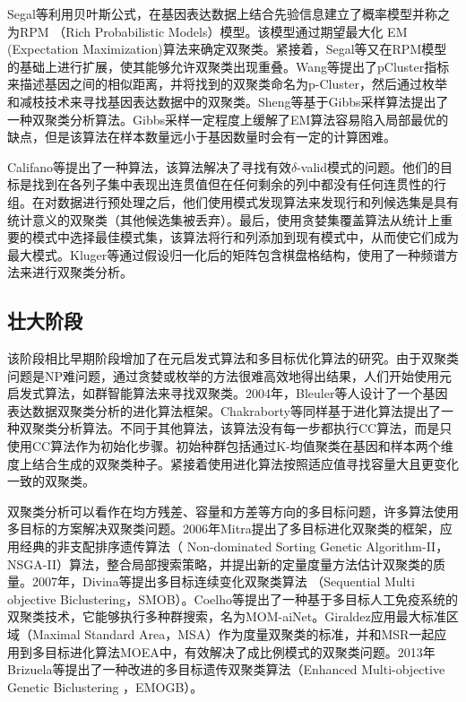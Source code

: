     Segal\cite{segal2001rich}等利用贝叶斯公式，在基因表达数据上结合先验信息建立了概率模型并称之为RPM （Rich Probabilistic Models）模型。该模型通过期望最大化 EM (Expectation Maximization)算法来确定双聚类。紧接着，Segal\cite{segal2002decomposing}等又在RPM模型的基础上进行扩展，使其能够允许双聚类出现重叠。Wang\cite{wang2002clustering}等提出了pCluster指标来描述基因之间的相似距离，并将找到的双聚类命名为p-Cluster，然后通过枚举和减枝技术来寻找基因表达数据中的双聚类。Sheng\cite{sheng2003biclustering}等基于Gibbs采样算法提出了一种双聚类分析算法。Gibbs采样一定程度上缓解了EM算法容易陷入局部最优的缺点，但是该算法在样本数量远小于基因数量时会有一定的计算困难。

    Califano\cite{califano2000analysis}等提出了一种算法，该算法解决了寻找有效$\delta$-valid模式的问题。他们的目标是找到在各列子集中表现出连贯值但在任何剩余的列中都没有任何连贯性的行组。在对数据进行预处理之后，他们使用模式发现算法来发现行和列候选集是具有统计意义的双聚类（其他候选集被丢弃）。最后，使用贪婪集覆盖算法从统计上重要的模式中选择最佳模式集，该算法将行和列添加到现有模式中，从而使它们成为最大模式。Kluger\cite{kluger2003spectral}等通过假设归一化后的矩阵包含棋盘格结构，使用了一种频谱方法来进行双聚类分析。

    \subsection{壮大阶段}
    该阶段相比早期阶段增加了在元启发式算法和多目标优化算法的研究。由于双聚类问题是NP难问题，通过贪婪或枚举的方法很难高效地得出结果，人们开始使用元启发式算法，如群智能算法来寻找双聚类。2004年，Bleuler\cite{bleuler2004ea}等人设计了一个基因表达数据双聚类分析的进化算法框架。Chakraborty\cite{chakraborty2005biclustering}等同样基于进化算法提出了一种双聚类分析算法。不同于其他算法，该算法没有每一步都执行CC算法，而是只使用CC算法作为初始化步骤。初始种群包括通过K-均值聚类在基因和样本两个维度上结合生成的双聚类种子。紧接着使用进化算法按照适应值寻找容量大且更变化一致的双聚类。
    
    双聚类分析可以看作在均方残差、容量和方差等方向的多目标问题，许多算法使用多目标的方案解决双聚类问题。2006年Mitra\cite{mitra2006multi}提出了多目标进化双聚类的框架，应用经典的非支配排序遗传算法（ Non-dominated Sorting Genetic Algorithm-II，NSGA-II）算法，整合局部搜索策略，并提出新的定量度量方法估计双聚类的质量。2007年，Divina\cite{divina2007multi}等提出多目标连续变化双聚类算法 （Sequential Multi objective Biclustering，SMOB）。Coelho\cite{coelho2008multi}等提出了一种基于多目标人工免疫系统的双聚类技术，它能够执行多种群搜索，名为MOM-aiNet。Giraldez\cite{giraldez2007evolutionary}应用最大标准区域（Maximal Standard Area，MSA）作为度量双聚类的标准，并和MSR一起应用到多目标进化算法MOEA中，有效解决了成比例模式的双聚类问题。2013年Brizuela\cite{brizuela2013improving}等提出了一种改进的多目标遗传双聚类算法（Enhanced Multi-objective Genetic Biclustering ，EMOGB）。    

